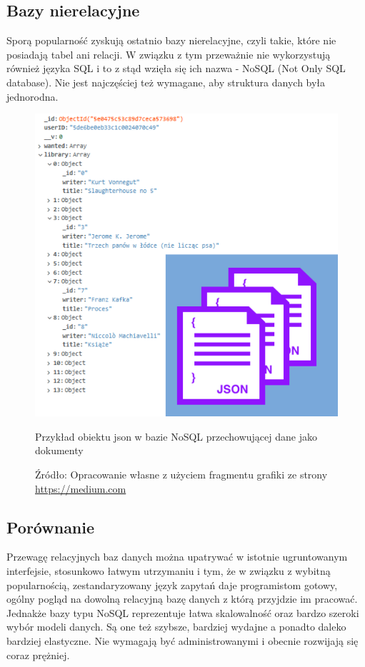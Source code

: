 \subsection{Bazy nierelacyjne}
Sporą popularność zyskują ostatnio bazy nierelacyjne, czyli takie, które nie posiadają tabel ani relacji. W związku z tym przeważnie nie wykorzystują również języka SQL i to z stąd wzięła się ich nazwa - NoSQL (Not Only SQL database). Nie jest najczęściej też wymagane, aby struktura danych była jednorodna.
\begin{figure}[H]
	\centering
	\includegraphics[width=\linewidth]{nosql.pdf}
	\caption{\centering Przykład obiektu json w bazie NoSQL przechowującej dane jako dokumenty}
	\caption*{\centering Źródło: {Opracowanie własne z użyciem fragmentu grafiki ze strony \url{https://medium.com}}}
\end{figure}

\subsection{Porównanie}
Przewagę relacyjnych baz danych można upatrywać w istotnie ugruntowanym interfejsie, stosunkowo łatwym utrzymaniu i tym, że w związku z wybitną popularnością, zestandaryzowany język zapytań daje programistom gotowy, ogólny pogląd na dowolną relacyjną bazę danych z którą przyjdzie im pracować.
Jednakże bazy typu NoSQL reprezentuje łatwa skalowalność oraz bardzo szeroki wybór modeli danych. Są one też szybsze, bardziej wydajne a ponadto daleko bardziej elastyczne. Nie wymagają być administrowanymi i obecnie rozwijają się coraz prężniej.~\cite{database}

